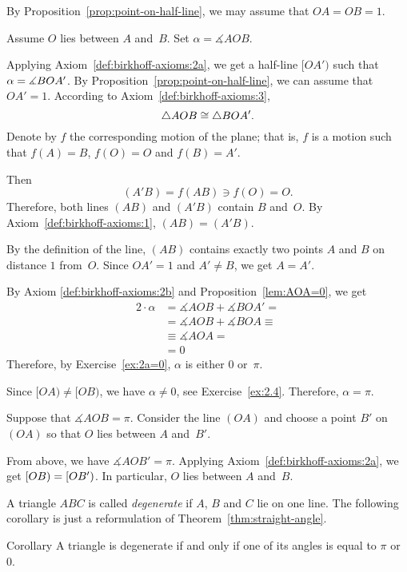 By Proposition~\ref{prop:point-on-half-line},  we may assume that
$O A = O B = 1$.

Assume $O$  
lies between $A$ and~$B$.
Set  $\alpha=\measuredangle A O B$.

Applying Axiom~\ref{def:birkhoff-axioms:2a},
we get a half-line $[OA')$ such that $\alpha\z=\measuredangle B O A'$.
By Proposition~\ref{prop:point-on-half-line}, we can assume that $OA'=1$.
According to Axiom~\ref{def:birkhoff-axioms:3},
\[\triangle AOB\z\cong\triangle BOA'.\]
Denote by $f$ the corresponding motion of the plane;
that is, $f$ is a motion such that $f(A)=B$, $f(O)=O$ and $f(B)=A'$. 

Then 
\[(A'B)=f(AB)\ni f(O)=O.\]
Therefore, both lines $(AB)$ and $(A'B)$ contain $B$ and~$O$.
By Axiom~\ref{def:birkhoff-axioms:1}, $(AB)=(A'B)$.

By the definition of the line,
$(AB)$ contains exactly two points $A$ and $B$ on distance $1$ from~$O$.
Since $OA'=1$ and $A'\ne B$, we get $A=A'$.

By Axiom \ref{def:birkhoff-axioms:2b} and Proposition~\ref{lem:AOA=0}, we get
\begin{align*}
2\cdot\alpha&=
\measuredangle AOB+\measuredangle BOA'=
\\
&=\measuredangle AOB+\measuredangle BOA\equiv
\\
&\equiv\measuredangle AOA=
\\
&= 0
\end{align*}
Therefore, by Exercise~\ref{ex:2a=0}, $\alpha$ is either $0$ or~$\pi$.

Since $[OA)\ne [OB)$,  
we have $\alpha\ne 0$, see Exercise~\ref{ex:2.4}.
Therefore, $\alpha=\pi$.


Suppose that $\measuredangle A O B= \pi$.
Consider the line $(OA)$ and choose a point $B'$ on $(OA)$ so that $O$ lies between $A$ and~$B'$.

From above, we have $\measuredangle AOB'=\pi$.
Applying Axiom~\ref{def:birkhoff-axioms:2a}, 
we get $[O B)\z=[O B')$.
In particular, $O$ lies between $A$ and~$B$.
\qeds 

A triangle $ABC$ is called 
\emph{degenerate}
if $A$, $B$ and $C$ lie on one line.
The following corollary is just a reformulation of Theorem~\ref{thm:straight-angle}.

\begin{thm}[\abs]{Corollary}\label{cor:degenerate=pi}
A triangle is degenerate if and only if one of its angles is equal to $\pi$ or~$0$.
\end{thm}

